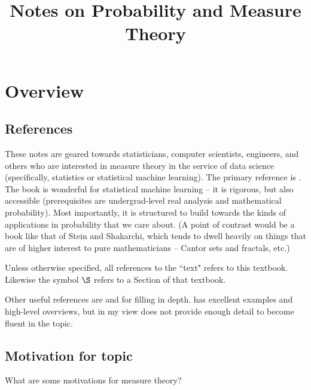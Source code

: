 \documentclass{article} %
\begin{document}
\title{Notes on Probability and Measure Theory} 
\maketitle
\setcounter{tocdepth}{2}
\tableofcontents
\newpage 

\section{Overview}

\subsection{References}
These notes are geared towards statisticians, computer scientists, engineers, and others who are interested in measure theory in the service of data science (specifically, statistics or statistical machine learning).  The primary reference is \cite{ash2000probability}.   The book is wonderful for statistical machine learning – it is rigorous,  but also accessible (prerequisites are undergrad-level real analysis and mathematical probability).  Most importantly, it is structured to build towards the kinds of applications in probability that we care about.   (A point of contrast would be a book like that of Stein and Shakarchi, which tends to dwell heavily on things that are of higher interest to pure mathematicians – Cantor sets and fractals, etc.) 

 Unless otherwise specified, all references to the ``text" refers to this textbook.  Likewise the symbol $\S$ refers to a Section of that textbook.
 
 Other useful references are \cite{folland1999real} and \cite{rudin1987real} for filling in depth.  \citet{durrett2010probability} has excellent examples and high-level overviews, but in my view does not provide enough detail to become fluent in the topic.
 
\subsection{Motivation for topic} \label{sec:motivation_for_topic}

What are some motivations for measure theory?
\end{document}
